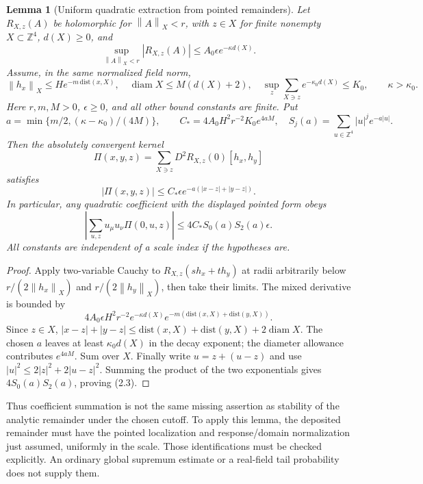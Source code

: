 \documentclass[11pt]{article}
\newtheorem{lemma}[proposition]{Lemma}
\theoremstyle{remark}
\newcommand{\norm}[1]{\left\|#1\right\|}
\begin{document}
\begin{lemma}[Uniform quadratic extraction from pointed remainders]
Let $R_{X,z}(A)$ be holomorphic for $\norm A_X<r$, with $z\in X$
for finite nonempty $X\subset\mathbb Z^4$, $d(X)\ge0$, and
\[
 \sup_{\norm A_X<r}|R_{X,z}(A)|
       \le A_0\epsilon e^{-\kappa d(X)}.
\]
Assume, in the same normalized field norm,
\[
 \norm{h_x}_X\le H e^{-m\,\mathrm{dist}(x,X)},\quad
 \operatorname{diam}X\le M(d(X)+2),\quad
 \sup_z\sum_{X\ni z}e^{-\kappa_0d(X)}\le K_0,
 \qquad \kappa>\kappa_0.
\]
Here $r,m,M>0$, $\epsilon\ge0$, and all other bound constants are finite.
Put
\[
 a=\min\{m/2,(\kappa-\kappa_0)/(4M)\},\qquad
 C_* =4A_0H^2r^{-2}K_0e^{4aM},
 \quad S_j(a)=\sum_{u\in\mathbb Z^4}|u|^j e^{-a|u|}.
\]
Then the absolutely convergent kernel
\[
 \Pi(x,y,z)=\sum_{X\ni z}D^2R_{X,z}(0)[h_x,h_y]
\]
satisfies
\[
 |\Pi(x,y,z)|\le C_*\epsilon
       e^{-a(|x-z|+|y-z|)}.
\]
In particular, any quadratic coefficient with the displayed pointed
form obeys
\[
 \left|\sum_{u,z}u_\mu u_\nu\Pi(0,u,z)\right|
       \le4C_*S_0(a)S_2(a)\epsilon.
 \tag{2.3}
\]
All constants are independent of a scale index if the hypotheses are.
\end{lemma}
\begin{proof}
Apply two-variable Cauchy to $R_{X,z}(s h_x+t h_y)$ at radii
arbitrarily below $r/(2\norm{h_x}_X)$ and
$r/(2\norm{h_y}_X)$, then take their limits. The mixed derivative
is bounded by
\[
 4A_0\epsilon H^2r^{-2}e^{-\kappa d(X)}
 e^{-m(\mathrm{dist}(x,X)+\mathrm{dist}(y,X))}.
\]
Since $z\in X$,
$|x-z|+|y-z|\le\mathrm{dist}(x,X)+\mathrm{dist}(y,X)
+2\operatorname{diam}X$.
The chosen $a$ leaves at least $\kappa_0d(X)$ in the decay exponent;
the diameter allowance contributes $e^{4aM}$. Sum over $X$.
Finally write $u=z+(u-z)$ and use
$|u|^2\le2|z|^2+2|u-z|^2$. Summing the product of the two
exponentials gives $4S_0(a)S_2(a)$, proving (2.3).
\end{proof}

Thus coefficient summation is not the same missing assertion as
stability of the analytic remainder under the chosen cutoff. To apply
this lemma, the deposited remainder must have the pointed localization
and response/domain normalization just assumed, uniformly in the scale.
Those identifications must be checked explicitly. An ordinary global
supremum estimate or a real-field tail probability does not supply them.
\end{document}
